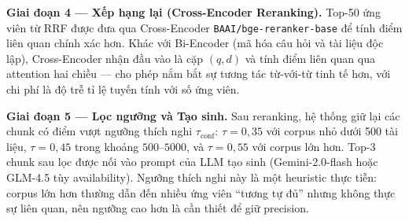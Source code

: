 \documentclass[12pt,a4paper]{report}
\theoremstyle{plain}
\theoremstyle{definition}
\begin{document}
	\textbf{Giai đoạn 4 --- Xếp hạng lại (Cross-Encoder Reranking).}
	Top-50 ứng viên từ RRF được đưa qua Cross-Encoder
	\texttt{BAAI/bge-reranker-base} để tính điểm liên quan chính xác hơn. Khác
	với Bi-Encoder (mã hóa câu hỏi và tài liệu độc lập), Cross-Encoder nhận
	đầu vào là cặp $(q, d)$ và tính điểm liên quan qua attention hai chiều --- cho
	phép nắm bắt sự tương tác từ-với-từ tinh tế hơn, với chi phí là độ trễ
	tỉ lệ tuyến tính với số ứng viên.

	\textbf{Giai đoạn 5 --- Lọc ngưỡng và Tạo sinh.}
	Sau reranking, hệ thống giữ lại các chunk có điểm vượt ngưỡng thích nghi
	$\tau_{\text{conf}}$: $\tau = 0{,}35$ với corpus nhỏ dưới 500 tài liệu,
	$\tau = 0{,}45$ trong khoảng $500$--$5000$, và $\tau = 0{,}55$ với corpus
	lớn hơn. Top-3 chunk sau lọc được nối vào prompt của LLM tạo sinh
	(Gemini-2.0-flash hoặc GLM-4.5 tùy availability). Ngưỡng thích nghi này
	là một heuristic thực tiễn: corpus lớn hơn thường dẫn đến nhiều ứng viên
	``tương tự đủ'' nhưng không thực sự liên quan, nên ngưỡng cao hơn là cần
	thiết để giữ precision.
\end{document}
